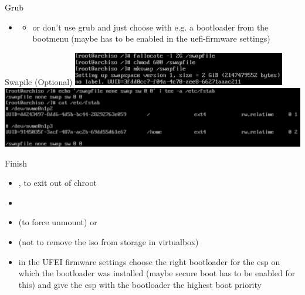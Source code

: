 \begin{frame}{Grub}
\begin{itemize}
\begin{itemize}
      \end{itemize}
    \item {}
    \begin{Sidenote}
      \begin{itemize}
        \scriptsize
        \item or don't use grub and just choose with e.g.  a bootloader from the bootmenu (maybe has to be enabled in the uefi-firmware settings)
      \end{itemize}
    \end{Sidenote}
  \end{itemize}
\end{frame}

\begin{frame}{Swapile (Optional)}
  \includegraphics[width=0.7\textwidth]{./figures/swapfile.png}
  \includegraphics[width=\textwidth]{./figures/swapfile2.png}
\end{frame}

\begin{frame}[fragile]{Finish}
  \begin{itemize}
    \item {}, to exit out of chroot
    \item {}
      \item {} (to force unmount) or 
    \item {} (not  to remove the iso from storage in virtualbox)
    \item in the UFEI firmware settings   choose the right bootloader for the esp on which the bootloader was installed (maybe secure boot has to be enabled for this) and give the esp with the bootloader the highest boot priority
  \end{itemize}
\end{frame}
